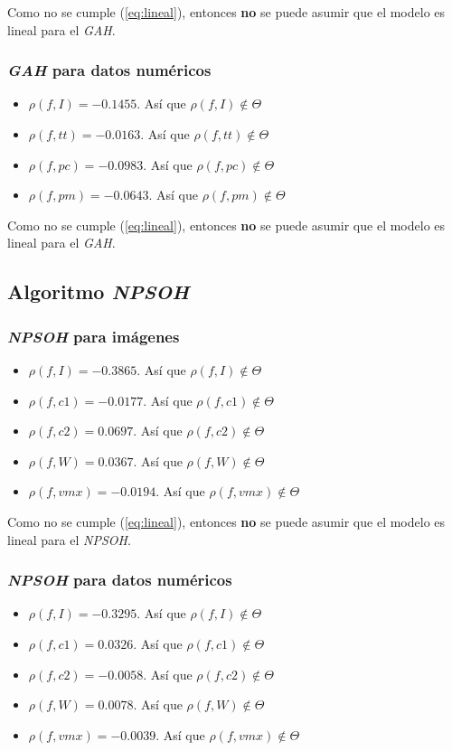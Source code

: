     Como no se cumple (\ref{eq:lineal}), entonces \textbf{no} se puede asumir
que el modelo es lineal para el \emph{GAH}.

\subsubsection{\emph{GAH} para datos numéricos}

\begin{itemize}
    \item $\rho(f, I) = -0.1455$. Así que $\rho(f, I) \notin \Theta$
    \item $\rho(f, tt) = -0.0163$. Así que $\rho(f, tt) \notin \Theta$
    \item $\rho(f, pc) = -0.0983$. Así que $\rho(f, pc) \notin \Theta$
    \item $\rho(f, pm) = -0.0643$. Así que $\rho(f, pm) \notin \Theta$
\end{itemize}

    Como no se cumple (\ref{eq:lineal}), entonces \textbf{no} se puede asumir
que el modelo es lineal para el \emph{GAH}.

\subsection{Algoritmo \emph{NPSOH}}

\subsubsection{\emph{NPSOH} para imágenes}
\begin{itemize}
    \item $\rho(f, I) = -0.3865$. Así que $\rho(f, I) \notin \Theta$
    \item $\rho(f, c1) = -0.0177$. Así que $\rho(f, c1) \notin \Theta$
    \item $\rho(f, c2) = 0.0697$. Así que $\rho(f, c2) \notin \Theta$
    \item $\rho(f, W) = 0.0367$. Así que $\rho(f, W) \notin \Theta$
    \item $\rho(f, vmx) = -0.0194$. Así que $\rho(f, vmx) \notin \Theta$
\end{itemize}

    Como no se cumple (\ref{eq:lineal}), entonces \textbf{no} se puede asumir
que el modelo es lineal para el \emph{NPSOH}.

\subsubsection{\emph{NPSOH} para datos numéricos}
\begin{itemize}
    \item $\rho(f, I) = -0.3295$. Así que $\rho(f, I) \notin \Theta$
    \item $\rho(f, c1) = 0.0326$. Así que $\rho(f, c1) \notin \Theta$
    \item $\rho(f, c2) = -0.0058$. Así que $\rho(f, c2) \notin \Theta$
    \item $\rho(f, W) = 0.0078$. Así que $\rho(f, W) \notin \Theta$
    \item $\rho(f, vmx) = -0.0039$. Así que $\rho(f, vmx) \notin \Theta$
\end{itemize}

